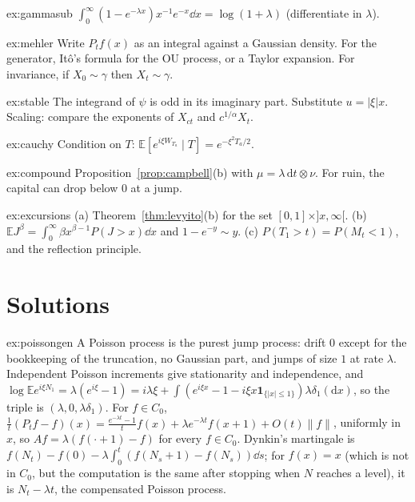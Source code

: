 \begin{hint}{ex:gammasub}
$\int_0^\infty(1-e^{-\lambda x})x^{-1}e^{-x}\dd x=\log(1+\lambda)$ (differentiate in $\lambda$).
\end{hint}

\begin{hint}{ex:mehler}
Write $P_tf(x)$ as an integral against a Gaussian density. For the generator, It\^o's formula for the OU process, or a Taylor expansion. For invariance, if $X_0\sim\gamma$ then $X_t\sim\gamma$.
\end{hint}

\begin{hint}{ex:stable}
The integrand of $\psi$ is odd in its imaginary part. Substitute $u=|\xi|x$. Scaling: compare the exponents of $X_{ct}$ and $c^{1/\alpha}X_t$.
\end{hint}

\begin{hint}{ex:cauchy}
Condition on $T$: $\mathbb E[e^{i\xi W_{T_a}}\mid T]=e^{-\xi^2T_a/2}$.
\end{hint}

\begin{hint}{ex:compound}
Proposition~\ref{prop:campbell}(b) with $\mu=\lambda\,\mathrm dt\otimes\nu$. For ruin, the capital can drop below $0$ at a jump.
\end{hint}

\begin{hint}{ex:excursions}
(a) Theorem~\ref{thm:levyito}(b) for the set $[0,1]\times]x,\infty[$. (b) $\mathbb EJ^\beta=\int_0^\infty\beta x^{\beta-1}P(J>x)\dd x$ and $1-e^{-y}\sim y$. (c) $P(T_1>t)=P(M_t<1)$, and the reflection principle.
\end{hint}

\section{Solutions}

\begin{solution}{ex:poissongen}
\idea A Poisson process is the purest jump process: drift $0$ except for the bookkeeping of the truncation, no Gaussian part, and jumps of size $1$ at rate $\lambda$.
\writeup Independent Poisson increments give stationarity and independence, and $\log\mathbb Ee^{i\xi N_1}=\lambda(e^{i\xi}-1)=i\lambda\xi+\int(e^{i\xi x}-1-i\xi x\mathbf 1_{\{|x|\le1\}})\lambda\delta_1(\mathrm dx)$, so the triple is
$(\lambda,0,\lambda\delta_1)$. For $f\in C_0$, $\frac1t(P_tf-f)(x)=\frac{e^{-\lambda t}-1}tf(x)+\lambda e^{-\lambda t}f(x+1)+O(t)\|f\|$, uniformly in $x$, so $Af=\lambda(f(\cdot+1)-f)$ for every $f\in C_0$. Dynkin's martingale is
$f(N_t)-f(0)-\lambda\int_0^t(f(N_s+1)-f(N_s))\dd s$; for $f(x)=x$ (which is not in $C_0$, but the computation is the same after stopping when $N$ reaches a level), it is $N_t-\lambda t$, the compensated Poisson process.
\end{solution}


